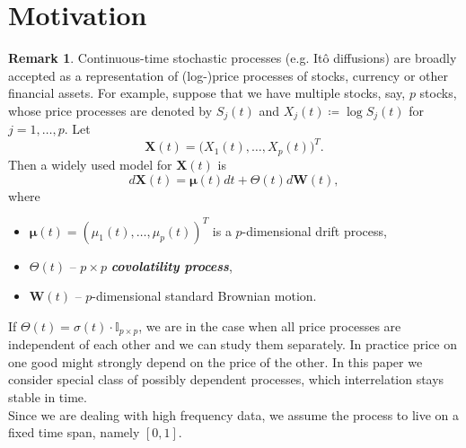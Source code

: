 \documentclass[a4paper,11pt]{book}
\theoremstyle{plain}
\theoremstyle{definition}
\newtheorem{rmrk}[thm]{Remark}
\newcommand{\define}[1]{\textit{\textbf{#1}}}
\begin{document}
	\section{Motivation}
	\begin{rmrk}
		Continuous-time stochastic processes (e.g. Itô diffusions) are broadly accepted as a representation of (log-)price processes of stocks, currency or other financial assets. For example, suppose that we have multiple stocks, say, $p$ stocks, whose price processes are denoted by $S_j(t)$ and $X_j(t) \coloneqq \log S_j(t)$ for $j = 1, \dots, p$. Let
		\[ \mathbf{X}(t) = \big(X_1(t), \dots, X_p(t)\big)^T. \]
		Then a widely used model for $\mathbf{X}(t)$ is
		\begin{equation} \label{X diffeq}
		d\mathbf{X}(t) = \boldsymbol{\mu}(t) dt + \Theta(t) d\mathbf{W}(t),
		\end{equation}
		where 
		\begin{itemize}
			\item $\boldsymbol{\mu}(t) = (\mu_1(t), \dots, \mu_p(t))^T$ is a $p$-dimensional drift process,
			\item $\Theta(t)$ -- $p \times p$ \define{covolatility process},
			\item $\mathbf{W}(t)$ -- $p$-dimensional standard Brownian motion.
		\end{itemize}
		If $\Theta(t) = \sigma(t) \cdot \mathbb{I}_{p \times p} $, we are in the case when all price processes are independent of each other and we can study them separately. In practice price on one good might strongly depend on the price of the other. In this paper we consider special class of possibly dependent processes, which interrelation stays stable in time. \\
		Since we are dealing with high frequency data, we assume the process to live on a fixed time span, namely $[0, 1]$. \\
	\end{rmrk}
\end{document}
